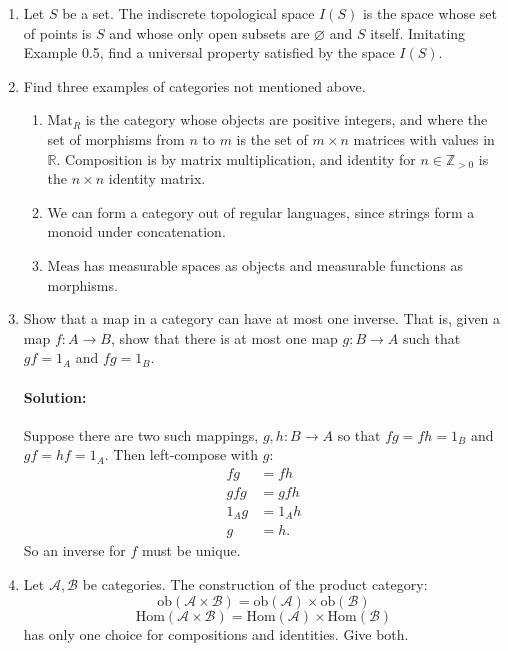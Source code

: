 \documentclass{article}
\begin{document}
\begin{enumerate} 
    \item Let $S$ be a set. The indiscrete topological space $I(S )$ is the space whose set of points is $S$ and whose only open subsets are $\varnothing$ and $S$ itself. Imitating Example 0.5, find a universal property satisfied by the space $I(S )$.
    \item Find three examples of categories not mentioned above.

        \begin{enumerate}
            \item  $\mathrm{Mat}_R$ is the category whose objects are positive integers, and where the set of morphisms from $n$ to $m$ is the set of $m\times n $ matrices with values in $\mathbb{R}$. Composition is by matrix multiplication, and identity for $n\in \mathbb{Z}_{> 0}$ is the $n\times n$ identity matrix.
            \item We can form a category out of regular languages, since strings form a monoid under concatenation.
            \item $\mathrm{Meas} $ has measurable spaces as objects and measurable functions as morphisms.
        \end{enumerate}

    \item Show that a map in a category can have at most one inverse. That is, given a map $f:A\to B$, show that there is at most one map $g:B\to A$ such that $gf=1_A$ and $fg=1_B$.
         \paragraph{Solution: }Suppose there are two such mappings, $g,h:B\to A$ so that $fg=fh=1_B$ and $gf=hf=1_A$. Then left-compose with $g$:
         \begin{align*}
             fg&=fh\\
             gfg&= gfh \\
             1_Ag&= 1_Ah \\
             g&=h
         .\end{align*}
         So an inverse for $f$ must be unique.

    \item Let $\mathscr{A},\mathscr{B}$ be categories. The construction of the product category:
         \[
         \mathrm{ob}(\mathscr{A}\times \mathscr{B})=\mathrm{ob}(\mathscr{A})\times \mathrm{ob}(\mathscr{B})
         \] \[ \mathrm{Hom}(\mathscr{A}\times \mathscr{B})= \mathrm{Hom}(\mathscr{A})\times\mathrm{Hom}( \mathscr{B})
         \] 
         has only one choice for compositions and identities. Give both.

\end{enumerate}
\end{document}
